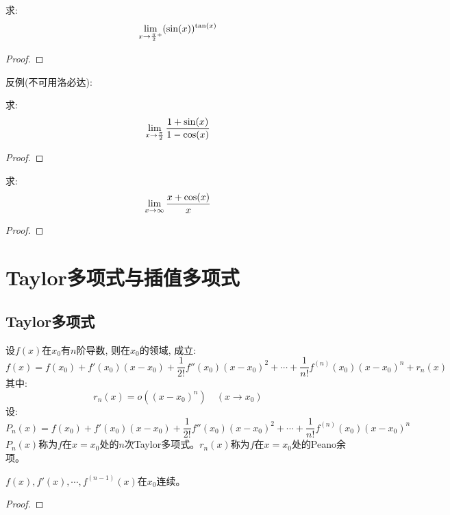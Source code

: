 \begin{example}
    求:
    \begin{equation*}
        \lim_{x \to \frac{\pi}{2}^+ } (\sin(x))^{\tan(x)}
    \end{equation*}
\end{example}
\begin{proof}
    
\end{proof}

反例(不可用洛必达):
\begin{example}
    求:
    \begin{equation*}
        \lim_{x \to \frac{\pi}{2} } \frac{1+\sin(x)}{1-\cos(x)}
    \end{equation*}
\end{example}
\begin{proof}
    
\end{proof}

\begin{example}
    求:
    \begin{equation*}
        \lim_{x \to \infty } \frac{x+\cos(x)}{x}
    \end{equation*}
\end{example}
\begin{proof}
    
\end{proof}

\section{Taylor多项式与插值多项式}
\subsection{Taylor多项式}
\begin{theorem}[带Peano余项的Taylor公式]
    设$f(x)$在$x_0$有$n$阶导数, 则在$x_0$的领域, 成立:
    \begin{equation*}
        f(x) = f(x_0) + f'(x_0)(x-x_0) + \frac{1}{2!}f''(x_0)(x-x_0)^2+\cdots+\frac{1}{n!}f^{(n)}(x_0)(x-x_0)^n+r_n(x)
    \end{equation*}
    其中:
    \begin{equation*}
        r_n(x) = o((x-x_0)^n) \quad (x \to x_0)
    \end{equation*}
    设:
    \begin{equation*}
        P_n(x) = f(x_0) + f'(x_0)(x-x_0) + \frac{1}{2!}f''(x_0)(x-x_0)^2+\cdots+\frac{1}{n!}f^{(n)}(x_0)(x-x_0)^n
    \end{equation*}
    $P_n(x)$称为$f$在$x=x_0$处的$n$次Taylor多项式。$r_n(x)$称为$f$在$x=x_0$处的Peano余项。
\end{theorem}
\begin{remark}
    $f(x), f'(x), \cdots, f^{(n-1)}(x)$在$x_0$连续。
\end{remark}
\begin{proof}
    
\end{proof}

